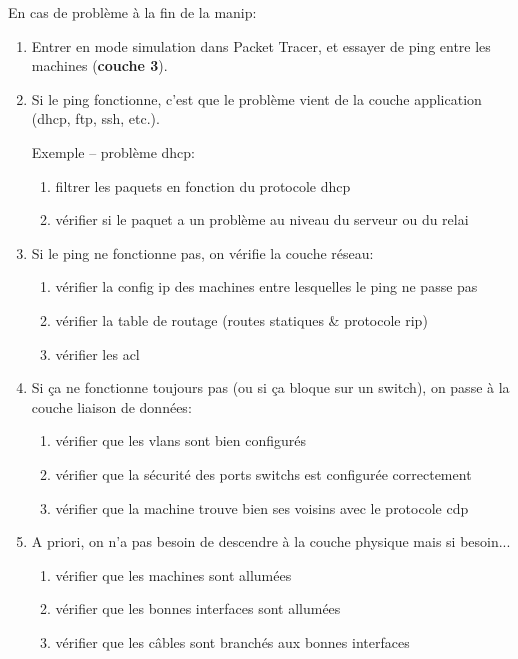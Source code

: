 \documentclass[a4paper]{article}
\begin{document}
\noindent En cas de problème à la fin de la manip:
\begin{enumerate}
    \item Entrer en mode simulation dans Packet Tracer, et essayer de ping entre les machines (\textbf{couche 3}).
    \item Si le ping fonctionne, c'est que le problème vient de la couche application (dhcp, ftp, ssh, etc.).
    \begin{example}
        Exemple -- problème dhcp:
        \begin{enumerate}
            \item filtrer les paquets en fonction du protocole dhcp
            \item vérifier si le paquet a un problème au niveau du serveur ou du relai
        \end{enumerate}
    \end{example}
    \item Si le ping ne fonctionne pas, on vérifie la couche réseau:
    \begin{enumerate}
        \item vérifier la config ip des machines entre lesquelles le ping ne passe pas
        \item vérifier la table de routage (routes statiques \& protocole rip)
        \item vérifier les acl
    \end{enumerate}
    \item Si ça ne fonctionne toujours pas (ou si ça bloque sur un switch), on passe à la couche liaison de données:
    \begin{enumerate}
        \item vérifier que les vlans sont bien configurés
        \item vérifier que la sécurité des ports switchs est configurée correctement
        \item vérifier que la machine trouve bien ses voisins avec le protocole cdp
    \end{enumerate}
    \item A priori, on n'a pas besoin de descendre à la couche physique mais si besoin...
    \begin{enumerate}
        \item vérifier que les machines sont allumées
        \item vérifier que les bonnes interfaces sont allumées
        \item vérifier que les câbles sont branchés aux bonnes interfaces
    \end{enumerate}
\end{enumerate}
\end{document}
